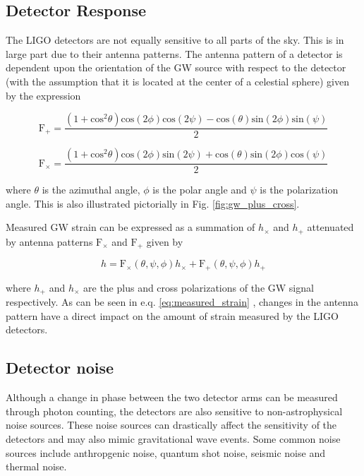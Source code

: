 \subsection{Detector Response}

The \ac{LIGO} detectors are not equally sensitive to all parts of 
the sky. This is in large part due to their antenna patterns. 
The antenna pattern of a detector is dependent upon the orientation 
of the \ac{GW} source with respect to the detector (with the assumption that it 
is located at the center of a celestial sphere) given by the expression 

\begin{equation}
    \mathrm{F}_{+} = \frac{(1+\mathrm{cos}^2 \theta) \mathrm{cos}(2\phi) \mathrm{cos}(2\psi) - \mathrm{cos}(\theta)\mathrm{sin}(2\phi)\mathrm{sin}(\psi)}{2}
\end{equation}

\begin{equation}
    \mathrm{F}_{\times} = \frac{(1+\mathrm{cos}^2 \theta) \mathrm{cos}(2\phi) \mathrm{sin}(2\psi) + \mathrm{cos}(\theta)\mathrm{sin}(2\phi)\mathrm{cos}(\psi)}{2}
\end{equation}

where $\theta$ is the azimuthal angle, $\phi$ is the polar angle and $\psi$ 
is the polarization angle. This is also illustrated pictorially in Fig. \ref{fig:gw_plus_cross}.

Measured \ac{GW} strain can be expressed as a summation of $h_{\times}$ 
and $h_{+}$ attenuated by antenna patterns $\mathrm{F}_{\times}$ and $\mathrm{F}_{+}$ 
given by

\begin{equation}
    h = \mathrm{F}_{\times}(\theta,\psi,\phi)h_{\times} + \mathrm{F}_{+}(\theta,\psi,\phi)h_{+} \label{eq:measured_strain}
\end{equation}

where $h_{+}$ and $h_{\times}$ are the plus and cross polarizations of 
the \ac{GW} signal respectively. As can be seen in e.q. \ref{eq:measured_strain}
, changes in the antenna pattern have a direct impact on the 
amount of strain measured by the \ac{LIGO} detectors.

\subsection{Detector noise}

Although a change in phase between 
the two detector arms can be measured through 
photon counting, the detectors are 
also sensitive to non-astrophysical noise 
sources. These noise sources can drastically affect 
the sensitivity of the detectors and may also mimic 
gravitational wave events. Some common noise sources 
include anthropgenic noise, quantum shot noise, 
seismic noise and thermal noise. 

